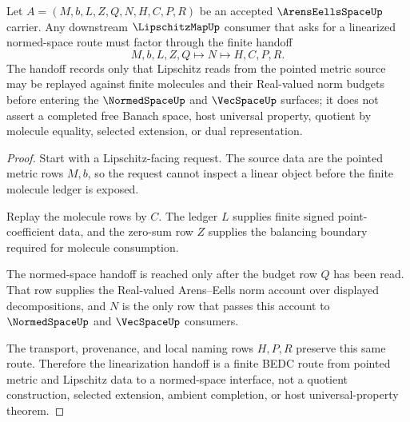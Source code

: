 \begin{theorem}
\label{thm:arens-eells-space-lipschitz-linearization-handoff}
Let $A=(M,b,L,Z,Q,N,H,C,P,R)$ be an accepted $\ArensEellsSpaceUp$ carrier. Any downstream $\LipschitzMapUp$ consumer that asks for a linearized normed-space route must factor through the finite handoff
$$
M,b,L,Z,Q \longmapsto N \longmapsto H,C,P,R .
$$
The handoff records only that Lipschitz reads from the pointed metric source may be replayed against finite molecules and their Real-valued norm budgets before entering the $\NormedSpaceUp$ and $\VecSpaceUp$ surfaces; it does not assert a completed free Banach space, host universal property, quotient by molecule equality, selected extension, or dual representation.
\end{theorem}
\begin{proof}
Start with a Lipschitz-facing request. The source data are the pointed metric rows $M,b$, so the request cannot inspect a linear object before the finite molecule ledger is exposed.

Replay the molecule rows by $C$. The ledger $L$ supplies finite signed point-coefficient data, and the zero-sum row $Z$ supplies the balancing boundary required for molecule consumption.

The normed-space handoff is reached only after the budget row $Q$ has been read. That row supplies the Real-valued Arens--Eells norm account over displayed decompositions, and $N$ is the only row that passes this account to $\NormedSpaceUp$ and $\VecSpaceUp$ consumers.

The transport, provenance, and local naming rows $H,P,R$ preserve this same route. Therefore the linearization handoff is a finite BEDC route from pointed metric and Lipschitz data to a normed-space interface, not a quotient construction, selected extension, ambient completion, or host universal-property theorem.
\end{proof}

